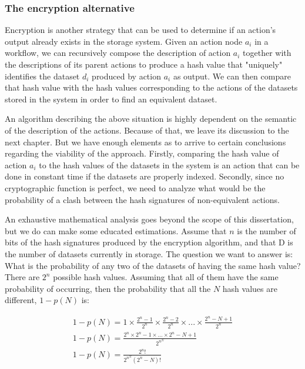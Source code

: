 \subsubsection{The encryption alternative}
Encryption is another strategy that can be used to determine if an action's output already exists in the storage system. Given an action node $a_i$ in a workflow, we can recursively compose the description of action $a_i$ together with the descriptions of its parent actions to produce a hash value that "uniquely" identifies the dataset $d_i$ produced by action $a_i$ as output.  We can then compare that hash value with the hash values corresponding to the actions of the datasets stored in the system in order to find an equivalent dataset.

An algorithm describing the above situation is highly dependent on the semantic of the description of the actions.  Because of that, we leave its discussion to the next chapter.  But we have enough elements as to arrive to certain conclusions regarding the viability of the approach.  Firstly, comparing the hash value of action $a_i$ to the hash values of the datasets in the system is an action that can be done in constant time if the datasets are properly indexed.  Secondly, since no cryptographic function is perfect, we need to analyze what would be the probability of a clash between the hash signatures of non-equivalent actions.  

An exhaustive mathematical analysis goes beyond the scope of this dissertation, but we do can make some educated estimations.  Assume that $n$ is the number of bits of the hash signatures produced by the encryption algorithm, and that D is the number of datasets currently in storage.  The question we want to answer is: What is the probability of any two of the datasets of having the same hash value?  There are $2^n$ possible hash values.  Assuming that all of them have the same probability of occurring, then the probability that all the $N$ hash values are different, $1 - p(N)$ is:

\begin{multline}
	1 - p(N) = 1 \times \frac{2^n - 1}{2^n} \times \frac{2^n - 2}{2^n} \times . . . \times \frac{2^n - N + 1}{2^n} \\ 
	1 - p(N) = \frac{2^n \times 2^n - 1 \times . . . \times 2^n - N + 1}{2^{n^{N}}} \\ 
	1 - p(N) = \frac{2^n !}{2^{n{^N}} (2^n - N)!} \\
\end{multline}

